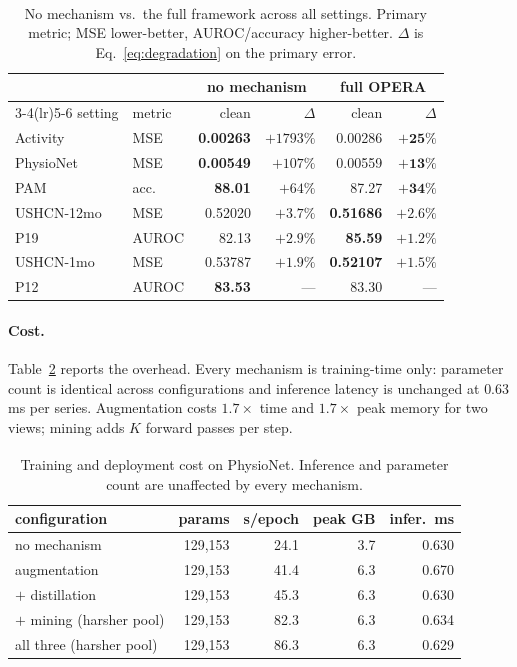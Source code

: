 \documentclass[sigconf,nonacm]{acmart}
\newcommand{\prelim}{\textsuperscript{\dag}}
\begin{document}
\begin{table}[t]
\caption{No mechanism vs.\ the full framework across all settings\prelim. Primary metric; MSE lower-better,
AUROC/accuracy higher-better. $\Delta$ is Eq.~\ref{eq:degradation} on the primary error.}
\label{tab:main}
\small
\begin{tabular}{llrrrr}
\toprule
 &  & \multicolumn{2}{c}{no mechanism} & \multicolumn{2}{c}{full OPERA} \\
\cmidrule(lr){3-4}\cmidrule(lr){5-6}
setting & metric & clean & $\Delta$ & clean & $\Delta$ \\
\midrule
Activity & MSE & \textbf{0.00263} & $+1793\%$ & 0.00286 & $\mathbf{+25\%}$ \\
PhysioNet & MSE & \textbf{0.00549} & $+107\%$ & 0.00559 & $\mathbf{+13\%}$ \\
PAM & acc. & \textbf{88.01} & $+64\%$ & 87.27 & $\mathbf{+34\%}$ \\
USHCN-12mo & MSE & 0.52020 & $+3.7\%$ & \textbf{0.51686} & $\mathbf{+2.6\%}$ \\
P19 & AUROC & 82.13 & $+2.9\%$ & \textbf{85.59} & $\mathbf{+1.2\%}$ \\
USHCN-1mo & MSE & 0.53787 & $+1.9\%$ & \textbf{0.52107} & $\mathbf{+1.5\%}$ \\
P12 & AUROC & \textbf{83.53} & --- & 83.30 & --- \\
\bottomrule
\end{tabular}
\end{table}

\paragraph{Cost.}
Table~\ref{tab:cost} reports the overhead. Every mechanism is training-time only: parameter count is identical
across configurations and inference latency is unchanged at $0.63$\,ms per series. Augmentation costs
$1.7\times$ time and $1.7\times$ peak memory for two views; mining adds $K$ forward passes per step.

\begin{table}[t]
\caption{Training and deployment cost on PhysioNet\prelim. Inference and parameter count are unaffected by
every mechanism.}
\label{tab:cost}
\small
\begin{tabular}{lrrrr}
\toprule
configuration & params & s/epoch & peak GB & infer.\ ms \\
\midrule
no mechanism & 129{,}153 & 24.1 & 3.7 & 0.630 \\
augmentation & 129{,}153 & 41.4 & 6.3 & 0.670 \\
$+$ distillation & 129{,}153 & 45.3 & 6.3 & 0.630 \\
$+$ mining (harsher pool) & 129{,}153 & 82.3 & 6.3 & 0.634 \\
all three (harsher pool) & 129{,}153 & 86.3 & 6.3 & 0.629 \\
\bottomrule
\end{tabular}
\end{table}
\end{document}
